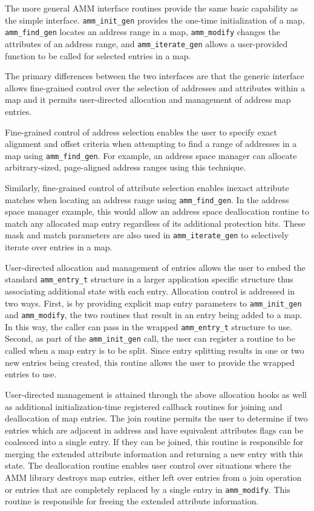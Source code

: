 The more general AMM interface routines provide the same basic capability
as the simple interface.
{\tt amm_init_gen} provides the one-time initialization of a map,
{\tt amm_find_gen} locates an address range in a map,
{\tt amm_modify} changes the attributes of an address range, and
{\tt amm_iterate_gen} allows a user-provided function to be called for
selected entries in a map.

The primary differences between the two interfaces are that
the generic interface allows fine-grained control over the selection
of addresses and attributes within a map and
it permits user-directed allocation and management of address map entries.

Fine-grained control of address selection
enables the user to specify exact alignment and offset criteria
when attempting to find a range of addresses in a map using {\tt amm_find_gen}.
For example, an address space manager can allocate arbitrary-sized,
page-aligned address ranges using this technique.

Similarly, fine-grained control of attribute selection
enables inexact attribute matches when locating an address range using
{\tt amm_find_gen}.
In the address space manager example, this would allow an address space
deallocation routine to match any allocated map entry regardless of its
additional protection bits.
These mask and match parameters are also used in {\tt amm_iterate_gen}
to selectively iterate over entries in a map.

User-directed allocation and management of entries
allows the user to embed the standard {\tt amm_entry_t} structure in a
larger application specific structure thus associating additional state
with each entry.
Allocation control is addressed in two ways.
First, is by providing explicit map entry parameters
to {\tt amm_init_gen} and {\tt amm_modify},
the two routines that result in an entry being added to a map.
In this way,
the caller can pass in the wrapped {\tt amm_entry_t} structure to use.
Second, as part of the {\tt amm_init_gen} call,
the user can register a routine to be called when a map entry is to be
split.
Since entry splitting results in one or two new entries being created,
this routine allows the user to provide the wrapped entries to use.

User-directed management is attained through the above allocation hooks
as well as additional initialization-time registered callback routines for
joining and deallocation of map entries.
The join routine permits the user to determine if two entries which are
adjacent in address and have equivalent attributes flags can be coalesced
into a single entry.
If they can be joined,
this routine is responsible for merging the extended attribute information
and returning a new entry with this state.
The deallocation routine
enables user control over situations where the AMM library destroys
map entries,
either left over entries from a join operation or entries that are
completely replaced by a single entry in {\tt amm_modify}.
This routine is responsible for freeing the extended attribute information.

